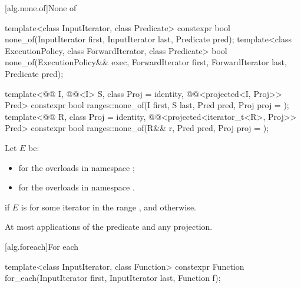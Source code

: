 [alg.none.of]{None of}

%
\begin{itemdecl}
template<class InputIterator, class Predicate>
  constexpr bool none_of(InputIterator first, InputIterator last, Predicate pred);
template<class ExecutionPolicy, class ForwardIterator, class Predicate>
  bool none_of(ExecutionPolicy&& exec, ForwardIterator first, ForwardIterator last,
               Predicate pred);

template<@@ I, @@<I> S, class Proj = identity,
         @@<projected<I, Proj>> Pred>
  constexpr bool ranges::none_of(I first, S last, Pred pred, Proj proj = {});
template<@@ R, class Proj = identity,
         @@<projected<iterator_t<R>, Proj>> Pred>
  constexpr bool ranges::none_of(R&& r, Pred pred, Proj proj = {});
\end{itemdecl}

\begin{itemdescr}
\pnum
Let $E$ be:
\begin{itemize}
\item
   for the overloads in namespace ;
\item
  for the overloads in namespace .
\end{itemize}

\pnum
\returns
{} if $E$ is 
for some iterator  in the range , and
 otherwise.

\pnum
\complexity
At most  applications of the predicate and any projection.
\end{itemdescr}

[alg.foreach]{For each}

%
\begin{itemdecl}
template<class InputIterator, class Function>
  constexpr Function for_each(InputIterator first, InputIterator last, Function f);
\end{itemdecl}

